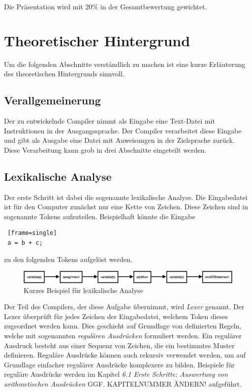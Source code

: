 \documentclass[12pt, a4paper, oneside, ngerman]{article}
\begin{document}
Die Präsentation wird mit 20\% in der Gesamtbewertung gewichtet.

\pagebreak
\section{Theoretischer Hintergrund}
Um die folgenden Abschnitte verständlich zu machen ist eine kurze Erläuterung des theoretischen Hintergrunds sinnvoll.
\subsection{Verallgemeinerung}
Der zu entwickelnde Compiler nimmt als Eingabe eine Text-Datei mit Instruktionen in der Ausgangssprache. Der Compiler verarbeitet diese Eingabe und gibt als Ausgabe eine Datei mit Anweisungen in der Zielsprache zurück. Diese Verarbeitung kann grob in drei Abschnitte eingeteilt werden.
\subsection{Lexikalische Analyse}
Der erste Schritt ist dabei die sogenannte lexikalische Analyse. Die Eingabedatei ist für den Computer zunächst nur eine Kette von Zeichen. Diese Zeichen sind in sogenannte Tokens aufzuteilen. Beispielhaft könnte die Eingabe
\begin{lstlisting} [frame=single]
 a = b + c;
\end{lstlisting}

zu den folgenden Tokens aufgelöst werden.

\begin{figure}[h!]
\centering
\includegraphics[scale=0.37]{lex_beispiel.png}
\caption{Kurzes Beispiel für lexikalische Analyse}
\label{fig:method}
\end{figure}


Der Teil des Compilers, der diese Aufgabe übernimmt, wird \textit{Lexer} genannt. Der Lexer überprüft für jedes Zeichen der Eingabedatei, welchem Token dieses zugeordnet werden kann. Dies geschieht auf Grundlage von definierten Regeln, welche mit sogenannten \textit{regulären Ausdrücken} formuliert werden. Ein regulärer Ausdruck besteht aus einer Sequenz von Zeichen, die ein bestimmtes Muster definieren. Reguläre Ausdrücke können auch rekursiv verwendet werden, um auf Grundlage einfacher regulärer Ausdrücke komplexere zu bilden. Beispiele für reguläre Ausdrücke werden im Kapitel \textit{6.1 Erste Schritte: Auswertung von arithmetischen Ausdrücken} GGF. KAPITELNUMMER ÄNDERN! aufgeführt.
\end{document}
